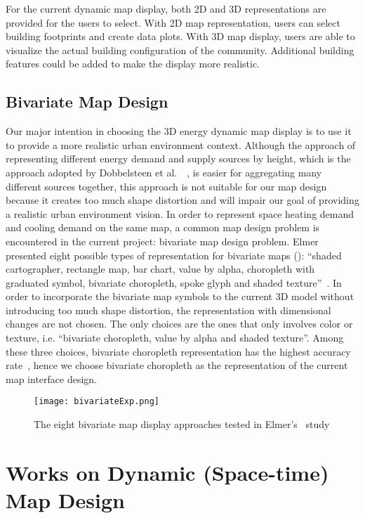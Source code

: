 For the current dynamic map display, both 2D and 3D representations
are provided for the users to select. With 2D map representation,
users can select building footprints and create data plots. With 3D
map display, users are able to visualize the actual building
configuration of the community. Additional building features could be
added to make the display more realistic.

\subsection{Bivariate Map Design} \label{bivariate} 

Our major intention in choosing the 3D energy dynamic map display is
to use it to provide a more realistic urban environment context.
Although the approach of representing different energy demand and
supply sources by height, which is the approach adopted by Dobbelsteen
et al.\ ~\cite{Dobbelsteen2013}, is easier for aggregating many
different sources together, this approach is not suitable for our map
design because it creates too much shape distortion and will impair
our goal of providing a realistic urban environment vision.  In order
to represent space heating demand and cooling demand on the same map,
a common map design problem is encountered in the current project:
bivariate map design problem. Elmer presented eight possible types of
representation for bivariate maps (): ``shaded
cartographer, rectangle map, bar chart, value by alpha, choropleth
with graduated symbol, bivariate choropleth, spoke glyph and shaded
texture''~\cite{Elmer2012}. In order to incorporate the bivariate map
symbols to the current 3D model without introducing too much shape
distortion, the representation with dimensional changes are not
chosen. The only choices are the ones that only involves color or
texture, i.e. ``bivariate choropleth, value by alpha and shaded
texture''. Among these three choices, bivariate choropleth
representation has the highest accuracy rate~\cite{Elmer2012}, hence
we choose bivariate choropleth as the representation of the current
map interface design.

\begin{figure}[h!]
  \centering
  \texttt{[image: bivariateExp.png]}
  \caption[Bivariate Map Symbol Tested]{The eight bivariate map
    display approaches tested in Elmer's~\cite{Elmer2012} study}
  \label{fig:bivariateExp}
\end{figure}

\section{Works on Dynamic (Space-time) Map Design}\label{mapDesign}

